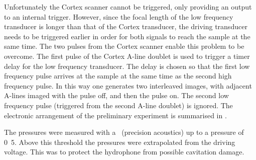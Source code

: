 Unfortunately the Cortex scanner cannot be triggered,
only providing an output to an internal trigger.
However, since the focal length of the low frequency transducer is longer than that
of the Cortex transducer,
the driving transducer needs to be triggered earlier in order for
both signals to reach the sample at the same time.
%
The two pulses from the Cortex scanner enable this problem to be overcome.
The first pulse of the Cortex A-line doublet is used to trigger 
a timer delay for the low frequency transducer.
The delay is chosen  so that the first low frequency pulse arrives at the
sample at the same time as the second high frequency pulse.
In this way one  generates two interleaved images, with adjacent A-lines
imaged with the pulse off, and then the pulse on.
The second low frequency pulse  (triggered from the second
A-line doublet) is ignored.
The electronic arrangement of the preliminary experiment is summarised in \figref{}.

The pressures were measured with a \hydrophone\ (precision acoustics) up to a pressure of 
\unit{0.5}\mega\pascal.  
Above this threshold the pressures were extrapolated from the driving voltage.  
This was to protect the hydrophone from possible cavitation damage.





